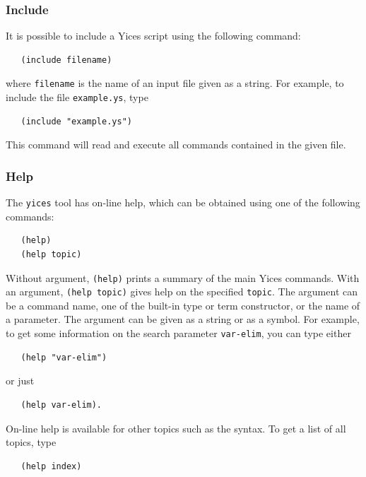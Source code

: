 \documentclass[11pt,twoside,fleqn,openright,titlepage]{cslreport}
\begin{document}
\subsubsection*{Include}

It is possible to include a Yices script using the following command:
\begin{small}
\begin{verbatim}
   (include filename)
\end{verbatim}
\end{small}
where \texttt{filename} is the name of an input file given as a
string. For example, to include the file \texttt{example.ys}, type
\begin{small}
\begin{verbatim}
   (include "example.ys")
\end{verbatim}
\end{small}
This command will read and execute all commands contained in the given
file.

\subsubsection*{Help}

The \texttt{yices} tool has on-line help, which can be obtained using one
of the following commands:
\begin{small}
\begin{verbatim}
   (help)
   (help topic)
\end{verbatim}
\end{small}
Without argument, \texttt{(help)} prints a summary of the main Yices
commands. With an argument, \texttt{(help topic)} gives help on the
specified \texttt{topic}. The argument can be a command name, one of
the built-in type or term constructor, or the name of a parameter.
The argument can be given as a string or as a symbol. For example, to
get some information on the search parameter \texttt{var-elim}, you
can type either
\begin{small}
\begin{verbatim}
   (help "var-elim")
\end{verbatim}
\end{small}
or just
\begin{small}
\begin{verbatim}
   (help var-elim).
\end{verbatim}
\end{small}
On-line help is available for other topics such as the syntax. To get a
list of all topics, type
\begin{small}
\begin{verbatim}
   (help index)
\end{verbatim}
\end{small}
\end{document}
